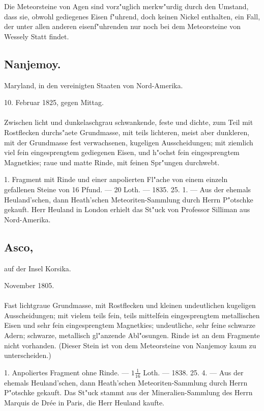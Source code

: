 \documentclass[a4paper, 11pt, oneside, polutonikogreek, german]{article}
\begin{document}
Die Meteorsteine von Agen sind vorz"uglich merkw"urdig durch den Umstand, dass sie, obwohl gediegenes Eisen f"uhrend, doch keinen Nickel enthalten, ein Fall, der unter allen anderen eisenf"uhrenden nur noch bei dem Meteorsteine von Wessely Statt findet.
\subsection{Nanjemoy.}
\begin{center}
\small
Maryland, in den vereinigten Staaten von Nord-Amerika.

10. Februar 1825, gegen Mittag.
\end{center}
\paragraph{}
Zwischen licht und dunkelaschgrau schwankende, feste und dichte, zum Teil mit Rostflecken durchs"aete Grundmasse, mit teils lichteren, meist aber dunkleren, mit der Grundmasse fest verwachsenen, kugeligen Ausscheidungen; mit ziemlich viel fein eingesprengtem gediegenen Eisen, und h"ochst fein eingesprengtem Magnetkies; raue und matte Rinde, mit feinen Spr"ungen durchwebt.

1. Fragment mit Rinde und einer anpolierten Fl"ache von einem einzeln gefallenen Steine von 16 Pfund. --- 20 Loth. --- 1835. 25. 1. --- Aus der ehemals Heuland'schen, dann Heath'schen Meteoriten-Sammlung durch Herrn P"otschke gekauft. Herr Heuland in London erhielt das St"uck von Professor Silliman aus Nord-Amerika.
\subsection[Asco.]{Asco,}
\begin{center}
\small
auf der Insel Korsika.

November 1805.
\end{center}
\paragraph{}
Fast lichtgraue Grundmasse, mit Rostflecken und kleinen undeutlichen kugeligen Ausscheidungen; mit vielem teils fein, teils mittelfein eingesprengtem metallischen Eisen und sehr fein eingesprengtem Magnetkies; undeutliche, sehr feine schwarze Adern; schwarze, metallisch gl"anzende Abl"osungen. Rinde ist an dem Fragmente nicht vorhanden. (Dieser Stein ist von dem Meteorsteine von Nanjemoy kaum zu unterscheiden.)

1. Anpoliertes Fragment ohne Rinde. --- $1\frac{1}{16}$ Loth. --- 1838. 25. 4. --- Aus der ehemals Heuland'schen, dann Heath'schen Meteoriten-Sammlung durch Herrn P"otschke gekauft. Das St"uck stammt aus der Mineralien-Sammlung des Herrn Marquis de Drée in Paris, die Herr Heuland kaufte.
\end{document}
